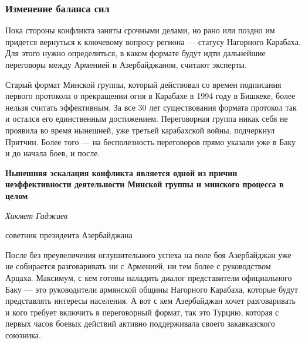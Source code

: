  
 
 
 
 

\subsubsection{Изменение баланса сил}
\label{sec:02_12_2020.news.ru.lenta_ru.1.karabah.balans_sil}

Пока стороны конфликта заняты срочными делами, но рано или поздно им придется
вернуться к ключевому вопросу региона --- статусу Нагорного Карабаха. Для этого
нужно определиться, в каком формате будут идти дальнейшие переговоры между
Арменией и Азербайджаном, считают эксперты.

Старый формат Минской группы, который действовал со времен подписания первого
протокола о прекращении огня в Карабахе в 1994 году в Бишкеке, более нельзя
считать эффективным. За все 30 лет существования формата протокол так и остался
его единственным достижением. Переговорная группа никак себя не проявила во
время нынешней, уже третьей карабахской войны, подчеркнул Притчин. Более того —
на бесполезность переговоров прямо указали уже в Баку и до начала боев, и
после.

\begin{leftbar}
	\bfseries
Нынешняя эскалация конфликта является одной из причин неэффективности
деятельности Минской группы и минского процесса в целом\par
\em
		Хикмет Гаджиев\par 
		советник президента Азербайджана\par
\end{leftbar}

После без преувеличения оглушительного успеха на поле боя Азербайджан уже не
собирается разговаривать ни с Арменией, ни тем более с руководством Арцаха.
Максимум, с кем готовы наладить диалог представители официального Баку --- это
руководители армянской общины Нагорного Карабаха, которые будут представлять
интересы населения. А вот с кем Азербайджан хочет разговаривать и кого требует
включить в переговорный формат, так это Турцию, которая с первых часов боевых
действий активно поддерживала своего закавказского союзника.

